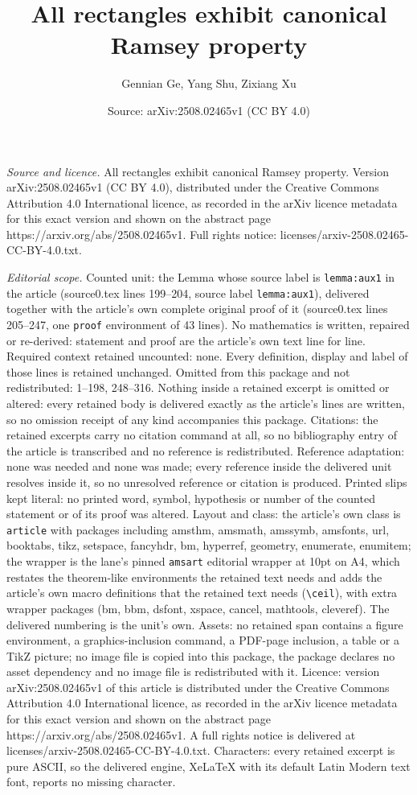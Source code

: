 \documentclass[10pt,a4paper]{amsart}
\title[All rectangles exhibit canonical Ramsey property]{All rectangles exhibit canonical Ramsey property}
\author{Gennian Ge, Yang Shu, Zixiang Xu}
\date{Source: arXiv:2508.02465v1 (CC BY 4.0)}
\begin{document}
\maketitle

\noindent\emph{Source and licence.} All rectangles exhibit canonical Ramsey property. Version arXiv:2508.02465v1 (CC BY 4.0), distributed under the Creative Commons Attribution 4.0 International licence, as recorded in the arXiv licence metadata for this exact version and shown on the abstract page https://arxiv.org/abs/2508.02465v1. Full rights notice: licenses/arxiv-2508.02465-CC-BY-4.0.txt.\par\smallskip

\noindent\textit{Editorial scope.} Counted unit: the Lemma whose source label is \texttt{lemma:aux1} in the article (source0.tex lines 199--204, source label \texttt{lemma:aux1}), delivered together with the article's own complete original proof of it (source0.tex lines 205--247, one \texttt{proof} environment of 43 lines). No mathematics is written, repaired or re-derived: statement and proof are the article's own text line for line. Required context retained uncounted: none. Every definition, display and label of those lines is retained unchanged. Omitted from this package and not redistributed: 1--198, 248--316. Nothing inside a retained excerpt is omitted or altered: every retained body is delivered exactly as the article's lines are written, so no omission receipt of any kind accompanies this package. Citations: the retained excerpts carry no citation command at all, so no bibliography entry of the article is transcribed and no reference is redistributed. Reference adaptation: none was needed and none was made; every reference inside the delivered unit resolves inside it, so no unresolved reference or citation is produced. Printed slips kept literal: no printed word, symbol, hypothesis or number of the counted statement or of its proof was altered. Layout and class: the article's own class is \texttt{article} with packages including amsthm, amsmath, amssymb, amsfonts, url, booktabs, tikz, setspace, fancyhdr, bm, hyperref, geometry, enumerate, enumitem; the wrapper is the lane's pinned \texttt{amsart} editorial wrapper at 10pt on A4, which restates the theorem-like environments the retained text needs and adds the article's own macro definitions that the retained text needs (\texttt{\textbackslash ceil}), with extra wrapper packages (bm, bbm, dsfont, xspace, cancel, mathtools, cleveref). The delivered numbering is the unit's own. Assets: no retained span contains a figure environment, a graphics-inclusion command, a PDF-page inclusion, a table or a TikZ picture; no image file is copied into this package, the package declares no asset dependency and no image file is redistributed with it. Licence: version arXiv:2508.02465v1 of this article is distributed under the Creative Commons Attribution 4.0 International licence, as recorded in the arXiv licence metadata for this exact version and shown on the abstract page https://arxiv.org/abs/2508.02465v1. A full rights notice is delivered at licenses/arxiv-2508.02465-CC-BY-4.0.txt. Characters: every retained excerpt is pure ASCII, so the delivered engine, XeLaTeX with its default Latin Modern text font, reports no missing character.
\end{document}

